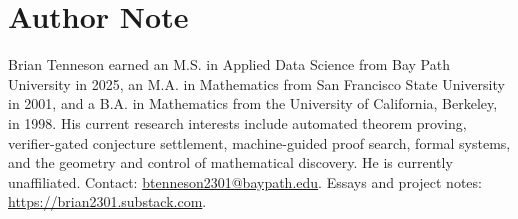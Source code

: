 \documentclass[11pt,letterpaper]{article}
\theoremstyle{remark}
\begin{document}
\section*{Author Note}
Brian Tenneson earned an M.S. in Applied Data Science from Bay Path University in 2025, an M.A. in Mathematics from San Francisco State University in 2001, and a B.A. in Mathematics from the University of California, Berkeley, in 1998. His current research interests include automated theorem proving, verifier-gated conjecture settlement, machine-guided proof search, formal systems, and the geometry and control of mathematical discovery. He is currently unaffiliated. Contact: \href{mailto:btenneson2301@baypath.edu}{btenneson2301@baypath.edu}. Essays and project notes: \url{https://brian2301.substack.com}.
\end{document}
